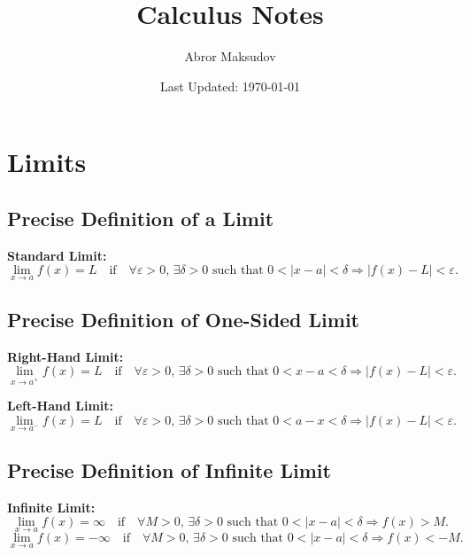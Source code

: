 \documentclass[a4paper,11pt]{article}
\title{Calculus Notes}
\author{Abror Maksudov}
\date{Last Updated: \today}
\theoremstyle{definition}
\theoremstyle{plain}
\theoremstyle{remark}
\begin{document}
\maketitle
\tableofcontents

\section{Limits}




\subsection{Precise Definition of a Limit}

\begin{tcolorbox}
    \textbf{Standard Limit:}  
    \[
    \lim_{x \to a} f(x) = L \quad \text{if} \quad \forall \varepsilon > 0, \, \exists \delta > 0 \text{ such that } 0 < |x - a| < \delta \Rightarrow |f(x) - L| < \varepsilon.
    \]
\end{tcolorbox}



\subsection{Precise Definition of One-Sided Limit}

\begin{tcolorbox}
\textbf{Right-Hand Limit:}  
\[
\lim_{x \to a^+} f(x) = L \quad \text{if} \quad \forall \varepsilon > 0, \, \exists \delta > 0 \text{ such that } 0 < x - a < \delta \Rightarrow |f(x) - L| < \varepsilon.
\]

\textbf{Left-Hand Limit:}  
\[
\lim_{x \to a^-} f(x) = L \quad \text{if} \quad \forall \varepsilon > 0, \, \exists \delta > 0 \text{ such that } 0 < a - x < \delta \Rightarrow |f(x) - L| < \varepsilon.
\]
\end{tcolorbox}




\subsection{Precise Definition of Infinite Limit}

\begin{tcolorbox}
\textbf{Infinite Limit:}  
\[
\lim_{x \to a} f(x) = \infty \quad \text{if} \quad \forall M > 0, \, \exists \delta > 0 \text{ such that } 0 < |x - a| < \delta \Rightarrow f(x) > M.
\]
\[
\lim_{x \to a} f(x) = -\infty \quad \text{if} \quad \forall M > 0, \, \exists \delta > 0 \text{ such that } 0 < |x - a| < \delta \Rightarrow f(x) < -M.
\]
\end{tcolorbox}
\end{document}
